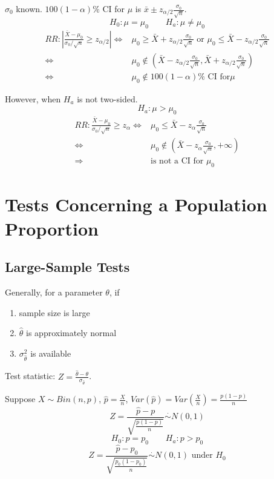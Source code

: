 $\sigma_0$ known. $100(1-\alpha)\%$ CI for $\mu$ is $\bar{x} \pm  z_{\alpha/2} \frac{\sigma_0}{\sqrt{n}} $.
\[H_0:\mu=\mu_0 \qquad H_a:\mu\neq\mu_0\]
\begin{align*}
RR:\left| \frac{\bar{X}-\mu_0}{\sigma_0/\sqrt{n}}\geq z_{\alpha/2} \right| \Leftrightarrow & \mu_0\geq \bar{X}+ z_{\alpha/2} \frac{\sigma_0}{\sqrt{n}} \text{ or } \mu_0\leq \bar{X}- z_{\alpha/2} \frac{\sigma_0}{\sqrt{n}} \\
\Leftrightarrow & \mu_0 \notin \left(\bar{X}-  z_{\alpha/2} \frac{\sigma_0}{\sqrt{n}},\bar{X}+ z_{\alpha/2} \frac{\sigma_0}{\sqrt{n}}\right) \\
\Leftrightarrow & \mu_0 \notin 100(1-\alpha)\% \text{ CI for} \mu
\end{align*}

However, when $H_a$ is not two-sided.
\[ H_a:\mu>\mu_0\]
\begin{align*}
RR: \frac{\bar{X}-\mu_0}{\sigma_0/\sqrt{n}}\geq z_{\alpha} \Leftrightarrow &  \mu_0\leq \bar{X}- z_{\alpha} \frac{\sigma_0}{\sqrt{n}} \\
\Leftrightarrow &  \mu_0 \notin \left(\bar{X}- z_{\alpha} \frac{\sigma_0}{\sqrt{n}},+\infty \right) \\
\Rightarrow & \text{is not a CI for }\mu_0 
\end{align*}

\section{Tests Concerning a Population Proportion}
\subsection{Large-Sample Tests}

Generally, for a parameter $\theta$, if
\begin{enumerate}
\item sample size is large
\item $\hat{\theta}$ is approximately normal
\item $\sigma_{\hat{\theta}}^2$ is available
\end{enumerate}

Test statistic: $Z=\frac{\hat{\theta}-\theta}{\sigma_{\hat{\theta}}}$.

Suppose $X\sim Bin(n,p)$, $\hat{p}=\frac{X}{n}$, $Var(\hat{p})=Var\left(\frac{X}{n}\right)=\frac{p(1-p)}{n}$
\[Z=\frac{\hat{p}-p}{\sqrt{\frac{p(1-p)}{n}}} \overset{\cdot}{\sim}N(0,1)\]
\[H_0:p=p_0 \qquad H_a:p>p_0\]
\[Z=\frac{\hat{p}-p_0}{\sqrt{\frac{p_0(1-p_0)}{n}}} \overset{\cdot}{\sim}N(0,1) \text{ under }H_0\]


